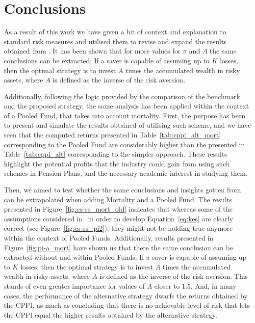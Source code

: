 \section{Conclusions}

As a result of this work we have given a bit of context and explanation to standard risk measures and utilised them to revise and expand the results obtained from \cite{a:guillen-optimisation}. It has been shown that for more values for $\pi$ and $A$ the same conclusions can be extracted: If a saver is capable of assuming up to $K$ losses, then the optimal strategy is to invest $A$ times the accumulated wealth in risky assets, where $A$ is defined as the inverse of the risk aversion.

Additionally, following the logic provided by the comparison of the benchmark and the proposed strategy, the same analysis has been applied within the context of a Pooled Fund, that takes into account mortality. First, the purpose has been to present and simulate the results obtained of utilising such scheme, and we have seen that the computed returns presented in Table~\ref{tab:cppi_alt_mort} corresponding to the Pooled Fund are considerably higher than the presented in Table~\ref{tab:cppi_alt} corresponding to the simpler approach. These results highlight the potential profits that the industry could gain from using such schemes in Pension Plans, and the necessary academic interest in studying them.

Then, we aimed to test whether the same conclusions and insights gotten from~\cite{a:guillen-optimisation} can be extrapolated when adding Mortality and a Pooled Fund. The results presented in Figure~\ref{fig:es-es_mort_old} indicates that whereas some of the assumptions considered in~\cite{a:guillen-optimisation} in order to develop Equation~\ref{eq:kes} are clearly correct (see Figure~\ref{fig:es-es_pi2}), they might not be holding true anymore within the context of Pooled Funds. Additionally, results presented in Figure~\ref{fig:pi-a_mort} have shown us that there the same conclusion can be extracted without and within Pooled Funds: If a saver is capable of assuming up to $K$ losses, then the optimal strategy is to invest $A$ times the accumulated wealth in risky assets, where $A$ is defined as the inverse of the risk aversion. This stands of even greater importance for values of $A$ closer to $1.5$. And, in many cases, the performance of the alternative strategy dwarfs the returns obtained by the CPPI, as much as concluding that there is no achievable level of risk that lets the CPPI equal the higher results obtained by the alternative strategy.

